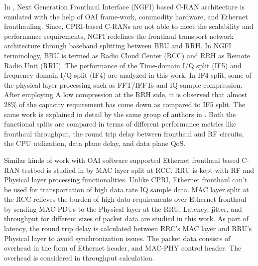 \begin{multicols}{2}
\begin{itemize}
In \cite{art3-key74}, Next Generation Fronthaul Interface (NGFI) based C-RAN architecture is emulated with the help of OAI frame-work, commodity hardware, and Ethernet fronthauling. Since, CPRI-based C-RANs are not able to meet the scalability and performance requirements, NGFI redefines the fronthaul transport network architecture through baseband splitting between BBU and RRH. In NGFI terminology, BBU is termed as Radio Cloud Center (RCC) and RRH as Remote Radio Unit (RRU). The performance of the Time-domain I/Q split (IF5) and frequency-domain I/Q split (IF4) are analyzed in this work. In IF4 split, some of the physical layer processing such as FFT/IFFTs and IQ sample compression. After employing A low compression at the RRH side, it is observed that almost 28\% of the capacity requirement has come down as compared to IF5 split. The same work is explained in detail by the same group of authors in \cite{art3-key75}. Both the functional splits are compared in terms of different performance metrics like fronthaul throughput, the round trip delay between fronthaul and RF circuits, the CPU utilization, data plane delay, and data plane QoS.

Similar kinds of work with OAI software supported Ethernet fronthaul based C-RAN testbed is studied in \cite{art3-key76} by MAC layer split at RCC. RRU is kept with RF and Physical layer processing functionalities. Unlike CPRI, Ethernet fronthaul can’t be used for transportation of high data rate IQ sample data. MAC layer split at the RCC relieves the burden of high data requirements over Ethernet fronthaul by sending MAC PDUs to the Physical layer at the RRU. Latency, jitter, and throughput for different sizes of packet data are studied in this work. As part of latency, the round trip delay is calculated between RRC’s MAC layer and RRU’s Physical layer to avoid synchronization issues. The packet data consists of overhead in the form of Ethernet header, and MAC-PHY control header. The overhead is considered in throughput calculation. 


\end{itemize}
\end{multicols}
